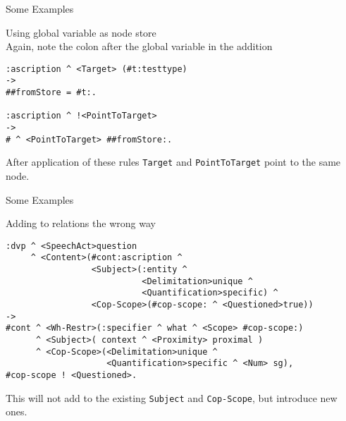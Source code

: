 \documentclass{beamer}
\begin{document}

\begin{frame}[fragile]{Some Examples}
\begin{block}{Using global variable as node store\\
Again, note the colon after the global variable in the addition}
\vspace*{-2.5ex}%
\begin{verbatim}
:ascription ^ <Target> (#t:testtype)
->
##fromStore = #t:.

:ascription ^ !<PointToTarget>
->
# ^ <PointToTarget> ##fromStore:.
\end{verbatim}
\end{block}

After application of these rules \texttt{Target} and \texttt{PointToTarget}
point to the same node.
\end{frame}


\begin{frame}[fragile]{Some Examples}
\begin{block}{Adding to relations the wrong way}\small
\vspace*{-2.5ex}%
\begin{verbatim}
:dvp ^ <SpeechAct>question
     ^ <Content>(#cont:ascription ^
                 <Subject>(:entity ^
                           <Delimitation>unique ^
                           <Quantification>specific) ^
                 <Cop-Scope>(#cop-scope: ^ <Questioned>true))
->
#cont ^ <Wh-Restr>(:specifier ^ what ^ <Scope> #cop-scope:)
      ^ <Subject>( context ^ <Proximity> proximal )
      ^ <Cop-Scope>(<Delimitation>unique ^
                    <Quantification>specific ^ <Num> sg),
#cop-scope ! <Questioned>.
\end{verbatim}
\end{block}

This will not add to the existing \texttt{Subject} and \texttt{Cop-Scope}, but
introduce new ones.
\end{frame}

\end{document}
